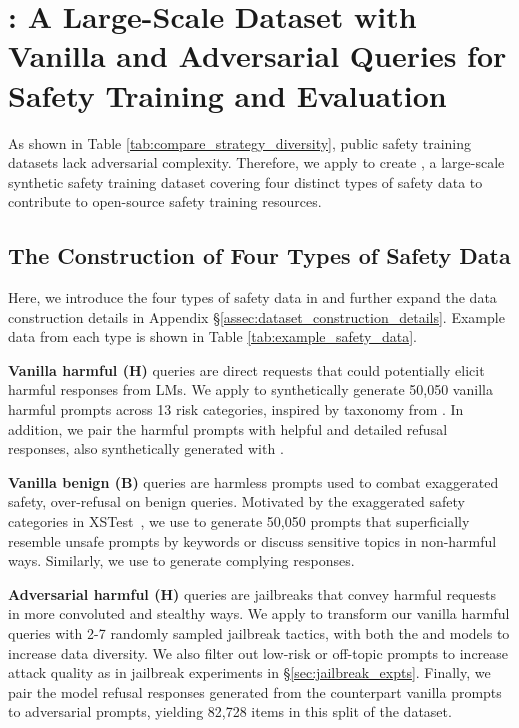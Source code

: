 \section{\dataset: A Large-Scale Dataset with Vanilla and Adversarial Queries for Safety Training and Evaluation}

As shown in Table \ref{tab:compare_strategy_diversity}, public safety training datasets lack adversarial complexity. Therefore, we apply \method to create \dataset, a large-scale synthetic safety training dataset covering four distinct types of safety data to contribute to open-source safety training resources.




\subsection{The Construction of Four Types of Safety Data}

Here, we introduce the four types of safety data in \dataset and further expand the data construction details in Appendix \S \ref{assec:dataset_construction_details}. Example data from each type is shown in Table \ref{tab:example_safety_data}. 

\textbf{Vanilla harmful (H)} queries are direct requests that could potentially elicit harmful responses from LMs. We apply \gptfour to synthetically generate 50,050 vanilla harmful prompts across 13 risk categories, inspired by taxonomy from \citet{weidinger2022taxonomy}. In addition, we pair the harmful prompts with helpful and detailed refusal responses, also synthetically generated with \chatgpt. 

\textbf{Vanilla benign (B)} queries are harmless prompts used to combat exaggerated safety, \ie over-refusal on benign queries. Motivated by the exaggerated safety categories in XSTest~\citep{xstest}, we use \gptfour to generate 50,050 prompts that superficially resemble unsafe prompts by keywords or discuss sensitive topics in non-harmful ways. Similarly, we use \chatgpt to generate complying responses.

\textbf{Adversarial harmful (H)} queries are jailbreaks that convey harmful requests in more convoluted and stealthy ways. We apply \method to transform our vanilla harmful queries with 2-7 randomly sampled \itwshort jailbreak tactics, with both the \mixtral and \gptfour models to increase data diversity. We also filter out low-risk or off-topic prompts to increase attack quality as in jailbreak experiments in \S \ref{sec:jailbreak_expts}. Finally, we pair the model refusal responses generated from the counterpart vanilla prompts to adversarial prompts, yielding 82,728 items in this split of the dataset.

